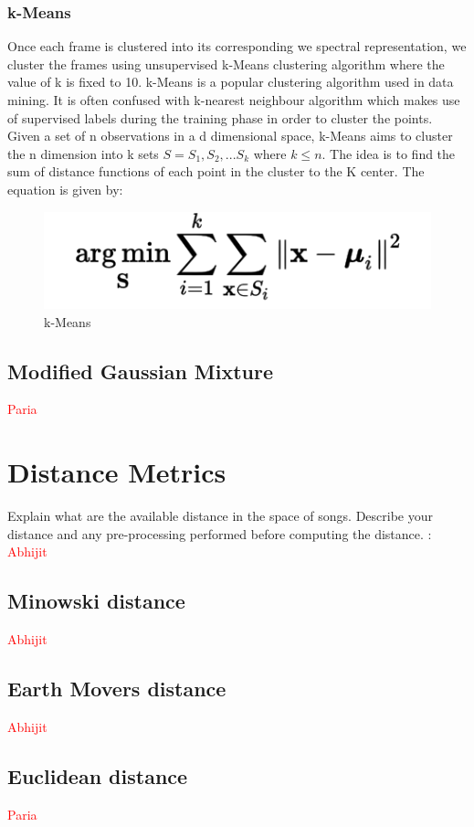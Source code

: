 \documentclass[12pt]{article}
\begin{document}
\subsubsection{k-Means}
Once each frame is clustered into its corresponding we spectral representation, we cluster the frames using unsupervised k-Means clustering algorithm where the value of k is  fixed to 10. k-Means is a popular clustering algorithm used in data mining. It is often confused with k-nearest neighbour algorithm which makes use of supervised labels during the training phase in order to cluster the points. Given a set of n observations in a d dimensional space, k-Means aims to cluster the n dimension into k sets $S = {S_1,S_2,...S_k}$ where $ k \leq n$. The idea is to find the sum of distance functions of each point in the cluster to the K center. The equation is given by:

\begin{figure}[h]
\center
\includegraphics{fig2.png}
\caption{k-Means}
\end{figure}

\subsection{Modified Gaussian Mixture} \textcolor{red}{Paria}

\section{Distance Metrics}
Explain what are the available distance in the space of songs.
Describe your distance and any pre-processing performed before
computing the distance. : \textcolor{red}{Abhijit}
\subsection{Minowski distance}\textcolor{red}{Abhijit}
\subsection{Earth Movers distance}\textcolor{red}{Abhijit}
\subsection{Euclidean distance}\textcolor{red}{Paria}
\end{document}

